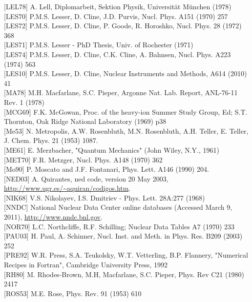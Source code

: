\documentclass[10pt]{article}
\begin{document}
[LEL78] A. Lell, Diplomarbeit, Sektion Physik, Universität München (1978)\\[0pt]
[LES70] P.M.S. Lesser, D. Cline, J.D. Purvis, Nucl. Phys. A151 (1970) 257\\[0pt]
[LES72] P.M.S. Lesser, D. Cline, P. Goode, R. Horoshko, Nucl. Phys. 28 (1972) 368\\[0pt]
[LES71] P.M.S. Lesser - PhD Thesis, Univ. of Rochester (1971)\\[0pt]
[LES74] P.M.S. Lesser, D. Cline, C.K. Cline, A. Bahnsen, Nucl. Phys. A223 (1974) 563\\[0pt]
[LES10] P.M.S. Lesser, D. Cline, Nuclear Instruments and Methods, A614 (2010) 41\\[0pt]
[MA78] M.H. Macfarlane, S.C. Pieper, Argonne Nat. Lab. Report, ANL-76-11 Rev. 1 (1978)\\[0pt]
[MCG69] F.K. McGowan, Proc. of the heavy-ion Summer Study Group, Ed; S.T. Thornton, Oak Ridge National Laboratory (1969) p38\\[0pt]
[Me53] N. Metropolis, A.W. Rosenbluth, M.N. Rosenbluth, A.H. Teller, E. Teller, J. Chem. Phys. 21 (1953) 1087.\\[0pt]
[ME61] E. Merzbacher, "Quantum Mechanics" (John Wiley, N.Y., 1961)\\[0pt]
[MET70] F.R. Metzger, Nucl. Phys. A148 (1970) 362\\[0pt]
[Mo90] P. Moscato and J.F. Fontanari, Phys. Lett. A146 (1990) 204.\\[0pt]
[NED03] A. Quirantes, ned code, version 20 May 2003, \href{http://www.ugr.es/~aquiran/codigos.htm}{http://www.ugr.es/\~{}aquiran/codigos.htm}.\\[0pt]
[NIK68] V.S. Nikolayev, I.S. Dmitriev - Phys. Lett. 28A:277 (1968)\\[0pt]
[NNDC] National Nuclear Data Center online databases (Accessed March 9, 2011), \href{http://www.nndc.bnl.gov}{http://www.nndc.bnl.gov}.\\[0pt]
[NOR70] L.C. Northcliffe, R.F. Schilling; Nuclear Data Tables A7 (1970) 233\\[0pt]
[PAU03] H. Paul, A. Schinner, Nucl. Inst. and Meth. in Phys. Res. B209 (2003) 252\\[0pt]
[PRE92] W.R. Press, S.A. Teukolsky, W.T. Vetterling, B.P. Flannery, "Numerical Recipes in Fortran", Cambridge University Press, 1992\\[0pt]
[RH80] M. Rhodes-Brown, M.H, Macfarlane, S.C. Pieper, Phys. Rev C21 (1980) 2417\\[0pt]
[ROS53] M.E. Rose, Phys. Rev. 91 (1953) 610\\[0pt]
\end{document}
